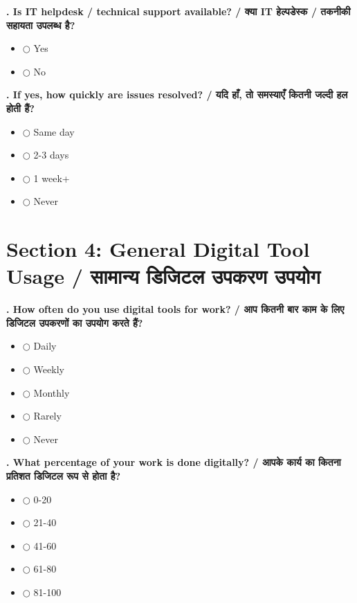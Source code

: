 \documentclass[11pt,a4paper]{article}
\newcounter{qcounter}
\begin{document}
\textbf{. Is IT helpdesk / technical support available? / क्या IT हेल्पडेस्क / तकनीकी सहायता उपलब्ध है?}
\vspace{0.1cm}
\begin{itemize}[label=, itemsep=0.1cm, leftmargin=0.5cm]
    \item $\bigcirc$ Yes
    \item $\bigcirc$ No
\end{itemize}
\vspace{0.2cm}

\textbf{. If yes, how quickly are issues resolved? / यदि हाँ, तो समस्याएँ कितनी जल्दी हल होती हैं?}
\vspace{0.1cm}
\begin{itemize}[label=, itemsep=0.1cm, leftmargin=0.5cm]
    \item $\bigcirc$ Same day
    \item $\bigcirc$ 2-3 days
    \item $\bigcirc$ 1 week+
    \item $\bigcirc$ Never
\end{itemize}
\vspace{0.2cm}


\section*{Section 4: General Digital Tool Usage / सामान्य डिजिटल उपकरण उपयोग}
\vspace{0.2cm}
\textbf{. How often do you use digital tools for work? / आप कितनी बार काम के लिए डिजिटल उपकरणों का उपयोग करते हैं?}
\vspace{0.1cm}
\begin{itemize}[label=, itemsep=0.1cm, leftmargin=0.5cm]
    \item $\bigcirc$ Daily
    \item $\bigcirc$ Weekly
    \item $\bigcirc$ Monthly
    \item $\bigcirc$ Rarely
    \item $\bigcirc$ Never
\end{itemize}
\vspace{0.2cm}

\textbf{. What percentage of your work is done digitally? / आपके कार्य का कितना प्रतिशत डिजिटल रूप से होता है?}
\vspace{0.1cm}
\begin{itemize}[label=, itemsep=0.1cm, leftmargin=0.5cm]
    \item $\bigcirc$ 0-20%
    \item $\bigcirc$ 21-40%
    \item $\bigcirc$ 41-60%
    \item $\bigcirc$ 61-80%
    \item $\bigcirc$ 81-100%
\end{itemize}
\vspace{0.2cm}
\end{document}
